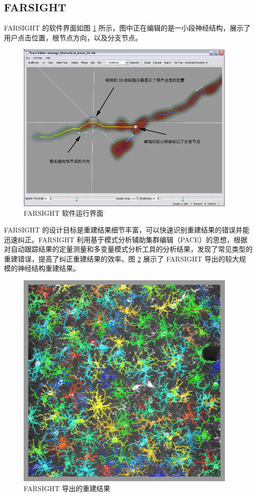\subsection{FARSIGHT}
FARSIGHT 的软件界面如图 \ref{FARSIGHT} 所示，图中正在编辑的是一小段神经结构，展示了用户点击位置，根节点方向，以及分支节点。
\begin{figure}
\centering
\includegraphics[width=108mm]{images/FARSIGHT}
\caption{FARSIGHT 软件运行界面}
\label{FARSIGHT}
\end{figure}

FARSIGHT 的设计目标是重建结果细节丰富，可以快速识别重建结果的错误并能迅速纠正。FARSIGHT 利用基于模式分析辅助集群编辑（PACE）的思想，根据对自动跟踪结果的定量测量和多变量模式分析工具的分析结果，发现了常见类型的重建错误，提高了纠正重建结果的效率。图 \ref{FARSIGHT-res} 展示了 FARSIGHT 导出的较大规模的神经结构重建结果。

\begin{figure}
\centering
\includegraphics[width=108mm]{images/FARSIGHT-res}
\caption{FARSIGHT 导出的重建结果}
\label{FARSIGHT-res}
\end{figure}

